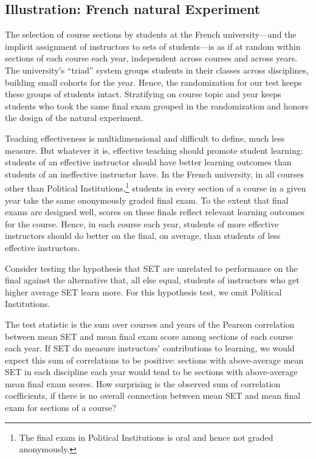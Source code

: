 \documentclass[12pt]{article}
\begin{document}
\subsection{Illustration: French natural Experiment} \label{sec:boringMethods}
The selection of course sections by students at the French university---and the implicit 
assignment of instructors to sets of students---is as if at random within sections of each
course each year, independent across courses and across years.
The university's ``triad'' system groups students in their classes across disciplines,
building small cohorts for the year.
Hence, the randomization for our test keeps these groups of students intact.
Stratifying on course topic and year keeps students who took the same final
exam grouped in the randomization and honors the design of the natural experiment.

Teaching effectiveness is multidimensional \citep{Marsh1997} and difficult to define,
much less measure. 
But whatever it is, effective teaching should promote student learning:
students of an effective instructor should have better learning outcomes
than students of an ineffective instructor have.
In the French university, in all courses other than Political Institutions,\footnote{%
 The final exam in Political Institutions is oral and hence not graded anonymously.
}
students in every section of a course in a given year take the same ononymously graded
final exam.
To the extent that final exams are designed well, scores on these finals reflect relevant 
learning outcomes for the course.
Hence, in each course each year, students of more effective instructors should do better 
on the final, on average, than students of less effective instructors.

Consider testing the hypothesis that SET are unrelated to performance on the final
against the alternative that, all else equal, students of instructors who get higher average SET
learn more.
For this hypothesis test, we omit Political Institutions.

The test statistic is the sum over courses and years of the Pearson correlation between
mean SET and mean final exam score among sections of each course each year.
If SET do measure instructors' contributions to learning, we would expect this sum of
correlations to be positive: sections with above-average mean SET in each discipline each year
would tend to be sections with above-average mean final exam scores.
How surprising is the observed sum of correlation coefficients, if there is no overall
connection between mean SET and mean final exam for sections of a course?
\end{document}
